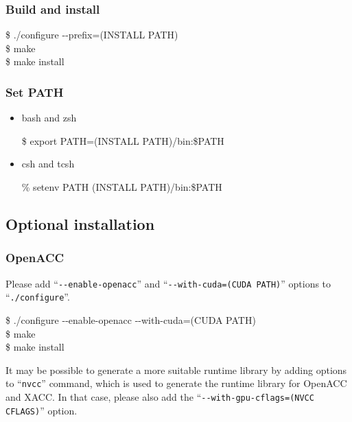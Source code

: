 \documentclass[graybox]{svmult}
\begin{document}
\subsubsection{Build and install}

\begin{svgraybox}
\$ ./configure {-}{-}prefix=(INSTALL PATH)\\
\$ make\\
\$ make install
\end{svgraybox}
%

\subsubsection{Set PATH}
\begin{itemize}
\item bash and zsh
\begin{svgraybox}
\$ export PATH=(INSTALL PATH)/bin:\$PATH
\end{svgraybox}
\item csh and tcsh
\begin{svgraybox}
\% setenv PATH (INSTALL PATH)/bin:\$PATH
\end{svgraybox}
\end{itemize}

\subsection{Optional installation}\label{sec:optional}
\subsubsection{OpenACC}
Please add ``{\tt {-}{-}enable-openacc}'' and ``{\tt {-}{-}with-cuda=(CUDA PATH)}'' options to ``{\tt ./configure}''.

\begin{svgraybox}
\$ ./configure {-}{-}enable-openacc {-}{-}with-cuda=(CUDA PATH)\\
\$ make\\
\$ make install
\end{svgraybox}

It may be possible to generate a more suitable runtime library by adding options to ``{\tt nvcc}'' command, 
which is used to generate the runtime library for OpenACC and XACC. 
In that case, please also add the ``{\tt {-}{-}with-gpu-cflags=(NVCC CFLAGS)}'' option.
\end{document}

